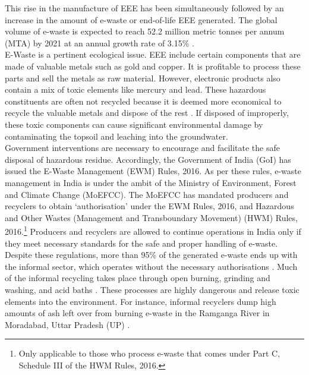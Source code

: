 \documentclass[a4paper, 12pt]{article}
\begin{document}
                   This rise in the manufacture of EEE has been simultaneously followed by an increase in the amount of e-waste or end-of-life EEE generated. The global volume of e-waste is expected to reach 52.2 million metric tonnes per annum (MTA) by 2021 at an annual growth rate of 3.15\% \parencite{assochamstats}. \\ 
                    
                    E-Waste is a pertinent ecological issue. EEE include certain components that are made of valuable metals such as gold and copper. It is profitable to process these parts and sell the metals as raw material. However, electronic products also contain a mix of toxic elements like mercury and lead. These hazardous constituents are often not recycled because it is deemed more economical to recycle the valuable metals and dispose of the rest \parencite{worstallnews}. If disposed of improperly, these toxic components can cause significant environmental damage by contaminating the topsoil and leaching into the groundwater. \\
                    
                    Government interventions are necessary to encourage and facilitate the safe disposal of hazardous residue. Accordingly, the Government of India (GoI) has issued the E-Waste Management (EWM) Rules, 2016. As per these rules, e-waste management in India is under the ambit of the Ministry of Environment, Forest and Climate Change (MoEFCC). The MoEFCC has mandated producers and recyclers to obtain ‘authorisation’ under the EWM Rules, 2016, and Hazardous and Other Wastes (Management and Transboundary Movement) (HWM) Rules, 2016.\footnote{Only applicable to those who process e-waste that comes under Part C, Schedule III of the HWM Rules, 2016.} Producers and recyclers are allowed to continue operations in India only if they meet necessary standards for the safe and proper handling of e-waste. \\
                     
                     Despite these regulations, more than 95\% of the generated e-waste ends up with the informal sector, which operates without the necessary authorisations \parencite{assochamstats}. Much of the informal recycling takes place through open burning, grinding and washing, and acid baths \parencite{csereport}. These processes are highly dangerous and release toxic elements into the environment. For instance, informal recyclers dump high amounts of ash left over from burning e-waste in the Ramganga River in Moradabad, Uttar Pradesh (UP) \parencite{csereport}. \\
                    
\end{document}
